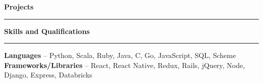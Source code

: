 \documentclass[11pt,letterpaper]{article}
\makeatletter
\newenvironment{topic}[1]
    {
    {\Large \centerline{#1}}
    \vspace*{0.03in}
    \hrule 
    \vspace*{0.05in}
    }
    {}
\newenvironment{event}
    {
    \begin{tabular*}{\textwidth}{l@{\extracolsep{\fill}}r}
    }
    {
    \end{tabular*}
    }
\newenvironment{detail}
    {
    \normalsize
    }
    {
    \vspace*{0.02in}
    }
\makeatother
\begin{document}
\begin{topic}{\textbf{Projects}}


    \end{topic} \vspace*{0.1in}


    \begin{topic}{\textbf{Skills and Qualifications}}
        \begin{detail}
            \textbf{Languages} -- Python, Scala, Ruby, Java, C, Go, JavaScript, SQL, Scheme \\
            \textbf{Frameworks/Libraries} -- React, React Native, Redux, Rails, jQuery, Node, Django, Express, Databricks 
        \end{detail}
    \end{topic}
\end{document}

